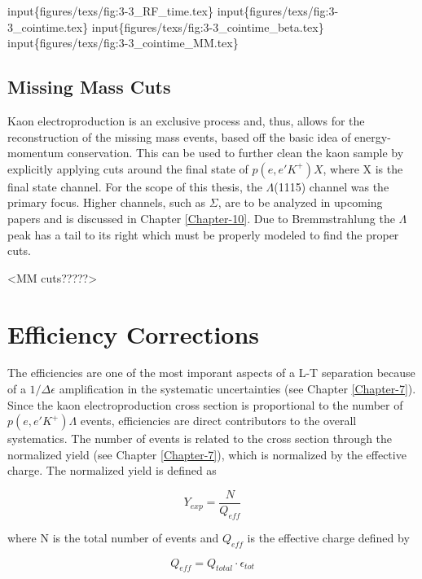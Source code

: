 \documentclass[
]{report}
\begin{document}
input\{figures/texs/fig:3-3\_RF\_time.tex\}
input\{figures/texs/fig:3-3\_cointime.tex\}
input\{figures/texs/fig:3-3\_cointime\_beta.tex\}
input\{figures/texs/fig:3-3\_cointime\_MM.tex\}

\hypertarget{missing-mass-cuts}{%
\subsection{\texorpdfstring{Missing Mass Cuts
\label{Chapter-5-3-4}}{Missing Mass Cuts }}\label{missing-mass-cuts}}

Kaon electroproduction is an exclusive process and, thus, allows for the
reconstruction of the missing mass events, based off the basic idea of
energy-momentum conservation. This can be used to further clean the kaon
sample by explicitly applying cuts around the final state of
\(p(e, e' K^+)X\), where X is the final state channel. For the scope of
this thesis, the \(\Lambda\)(1115) channel was the primary focus. Higher
channels, such as \(\Sigma\), are to be analyzed in upcoming papers and
is discussed in Chapter \ref{Chapter-10}. Due to Bremmstrahlung the
\(\Lambda\) peak has a tail to its right which must be properly modeled
to find the proper cuts.

\textless MM cuts?????\textgreater{}

\hypertarget{Section-5.4}{%
\section{Efficiency Corrections}\label{Section-5.4}}

The efficiencies are one of the most imporant aspects of a L-T
separation because of a \(1/\Delta\epsilon\) amplification in the
systematic uncertainties (see Chapter \ref{Chapter-7}). Since the kaon
electroproduction cross section is proportional to the number of
\(p(e, e' K^+)\Lambda\) events, efficiencies are direct contributors to
the overall systematics. The number of events is related to the cross
section through the normalized yield (see Chapter \ref{Chapter-7}),
which is normalized by the effective charge. The normalized yield is
defined as

\begin{equation} 
  Y_{exp}=\frac{N}{Q_{eff}}
  \label{eq:norm_yield} 
\end{equation}

\noindent where N is the total number of events and \(Q_{eff}\) is the
effective charge defined by

\begin{equation} 
  Q_{eff}=Q_{total}\cdot\epsilon_{tot}
  \label{eq:eff_charge} 
\end{equation}
\end{document}
